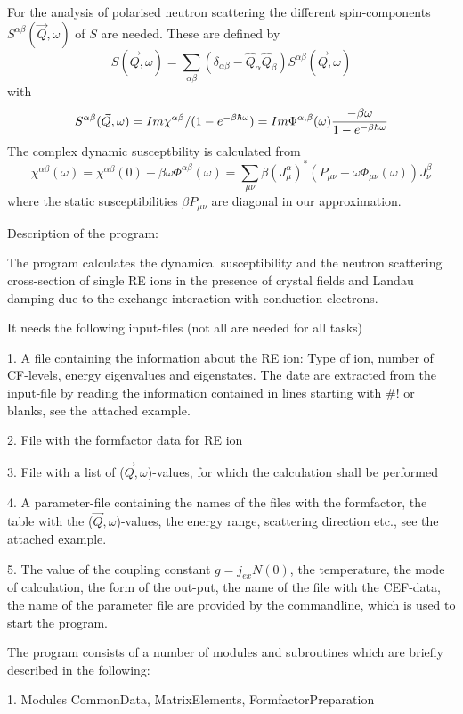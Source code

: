 For the analysis of polarised neutron scattering the different
spin-components $S^{\alpha\beta}(\vec Q,\omega)$ of $S$ are needed. 
These are defined by
$$
S(\vec Q,\omega)= \sum_{\alpha\beta}(\delta_{\alpha\beta} 
- \hat Q_\alpha \hat Q_\beta)S^{\alpha\beta}(\vec Q,\omega)
$$
with
$$
S^{\alpha\beta}(\vec Q,\omega)=
Im \chi^{\alpha\beta}/(1-e^{-\beta \hbar \omega})=
Im \Phi^{\alpha,\beta}(\omega){-\beta \omega \over 1-e^{-\beta \hbar \omega}} 
$$
The complex dynamic susceptbility is calculated from
$$
\chi^{\alpha\beta}(\omega)= \chi^{\alpha\beta}(0)-\beta \omega
\Phi^{\alpha\beta}(\omega)= \sum_{\mu\nu}\beta (J^\alpha_\mu)^*(P_{\mu\nu}-\omega
\Phi_{\mu\nu}(\omega ))J^\beta_\nu
$$
where the static susceptibilities $\beta P_{\mu\nu}$ are diagonal in our
approximation.  

\bigskip
\newpage

\vfill
\eject
\parindent=0pt
{\large Description of the program:}

The program calculates the dynamical susceptibility
and the neutron scattering cross-section of single RE ions in the presence
of crystal fields and Landau damping due to the exchange interaction with 
conduction electrons.

It needs the following input-files (not all are needed for all tasks)

1. A file containing the information about the RE ion: Type of ion, number of
CF-levels, energy eigenvalues and eigenstates. The date are extracted from
the input-file by reading the information contained in lines starting with
$\#!$ or blanks, see the attached example. 

2. File with the formfactor data for RE ion

3. File with a list of ($\vec Q,\omega$)-values, for which the calculation
shall be performed

4. A parameter-file containing  the names of the files with the
formfactor, the  table with the ($\vec Q,\omega$)-values, the energy range, 
scattering direction etc., see the attached example.

5. The value of the coupling constant $g=j_{ex}N(0)$, the temperature,  
the mode of calculation, the form of the out-put, the name of the file with
the CEF-data, the  name of the parameter file are provided by the
commandline, which is used to start the program. 

   
The program consists of a number of modules and subroutines which are
briefly described in the following: 
 
1. Modules CommonData, MatrixElements, FormfactorPreparation

